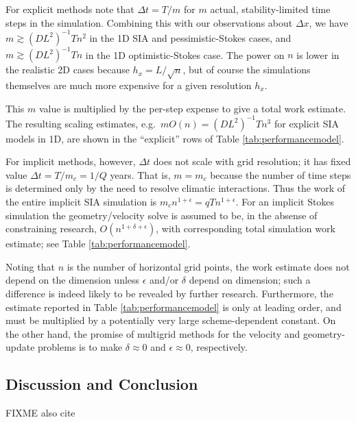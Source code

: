 \documentclass[twocolumn,letterpaper]{igs}
\newcommand\eps{\epsilon}
\begin{document}
For explicit methods note that $\Delta t = T/m$ for $m$ actual, stability-limited time steps in the simulation.  Combining this with our observations about $\Delta x$, we have $m \gtrsim (DL^2)^{-1} T n^2$ in the 1D SIA and pessimistic-Stokes cases, and $m \gtrsim (DL^2)^{-1} T n$ in the 1D optimistic-Stokes case.  The power on $n$ is lower in the realistic 2D cases because $h_x = L/\sqrt{n}$, but of course the simulations themselves are much more expensive for a given resolution $h_x$.

This $m$ value is multiplied by the per-step expense to give a total work estimate.  The resulting scaling estimates, e.g.~$m O(n) = (DL^2)^{-1} T n^3$ for explicit SIA models in 1D, are shown in the ``explicit'' rows of Table \ref{tab:performancemodel}.

For implicit methods, however, $\Delta t$ does not scale with grid resolution; it has fixed value $\Delta t = T / m_c = 1/Q$ years.  That is, $m=m_c$ because the number of time steps is determined only by the need to resolve climatic interactions.  Thus the work of the entire implicit SIA simulation is $m_c n^{1+\eps} = q T n^{1+\eps}$.  For an implicit Stokes simulation the geometry/velocity solve is assumed to be, in the absense of constraining research, $O(n^{1+\delta+\eps})$, with corresponding total simulation work estimate; see Table \ref{tab:performancemodel}.

Noting that $n$ is the number of horizontal grid points, the work estimate does not depend on the dimension unless $\eps$ and/or $\delta$ depend on dimension; such a difference is indeed likely to be revealed by further research.  Furthermore, the estimate reported in Table \ref{tab:performancemodel} is only at leading order, and must be multiplied by a potentially very large scheme-dependent constant.  On the other hand, the promise of multigrid methods for the velocity and geometry-update problems is to make $\delta \approx 0$ and $\eps \approx 0$, respectively.

\subsection{Discussion and Conclusion}

FIXME also cite \citep{LofgrenAhlkronaHelanow2021}




\end{document}
